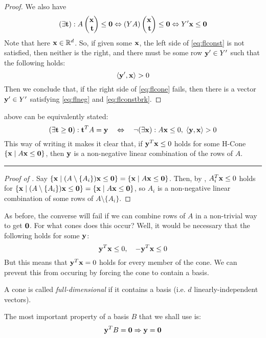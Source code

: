 \begin{proof}
	We also have
	\begin{equation}\label{eq:flconst}
		(\exists \t) : A \xt \leq \0 \Leftrightarrow
		(YA)\xt \leq \0 \Leftrightarrow
		Y'\x \leq \0
	\end{equation}
	Note that here $\mathbf{x} \in \mathbb{R}^d$.  So, if given some $\mathbf{x}$, the left side of \eqref{eq:flconst} is not satisfied, then neither is the right, and there must be some row $\mathbf{y}' \in Y'$ such that the following holds:
	\begin{equation}\label{eq:flconstbrk} \left\langle \mathbf{y}', \mathbf{x} \right\rangle > 0 \end{equation}
	Then we conclude that, if the right side of \eqref{eq:flcone} fails, then there is a vector $\mathbf{y}' \in Y'$ satisfying \eqref{eq:flneg} and \eqref{eq:flconstbrk}.
\end{proof}

\begin{Remark}\label{valid_cone_ineq}
	 above can be equivalently stated:
	\[ (\exists \mathbf{t} \geq \mathbf{0}) : \mathbf{t}^T A = \mathbf{y} \quad\Leftrightarrow\quad
		\neg(\exists \mathbf{x}) : A\mathbf{x} \leq 0,\; \left\langle \mathbf{y}, \mathbf{x} \right\rangle > 0 \]
	This way of writing it makes it clear that, if $\mathbf{y}^T\mathbf{x}\leq 0$ holds for some H-Cone $\left\{\mathbf{x}\;|\; A\mathbf{x}\leq\mathbf{0}\right\}$, then $\mathbf{y}$ is a non-negative linear combination of the rows of $A$.
\end{Remark}

\hrule

\begin{proof}[Proof of ]
	Say $\left\{\mathbf{x}\;|\; (A\setminus\{A_i\})\mathbf{x}\leq\mathbf{0}\right\} = \left\{\mathbf{x}\;|\; A\mathbf{x}\leq\mathbf{0}\right\}$.  Then, by , $A_i^T\mathbf{x}\leq 0$ holds for $\left\{\mathbf{x}\;|\; (A\setminus\{A_i\})\mathbf{x}\leq\mathbf{0}\right\} = \left\{\mathbf{x}\;|\; A\mathbf{x}\leq\mathbf{0}\right\}$, so $A_i$ is a non-negative linear combination of some rows of $A\setminus\{A_i\}$.
\end{proof}

As before, the converse will fail if we can combine rows of $A$ in a non-trivial way to get $\mathbf{0}$.  For what cones does this occur?  Well, it would be necessary that the following holds for some $\mathbf{y}$:
\[ \mathbf{y}^T\mathbf{x} \leq 0,\quad -\mathbf{y}^T\mathbf{x}\leq 0 \]
But this means that $\mathbf{y}^T\mathbf{x} = 0$ holds for every member of the cone.  We can prevent this from occuring by forcing the cone to contain a basis.

\begin{Def}
	A cone is called \textit{full-dimensional} if it contains a basis (i.e. $d$ linearly-independent vectors).
\end{Def}

The most important property of a basis $B$ that we shall use is:
\begin{equation}
	\mathbf{y}^T B = \mathbf{0} \Rightarrow \mathbf{y} = \mathbf{0} \label{basis_li}
\end{equation}

